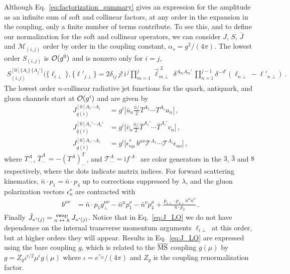 \documentclass[letterpaper,11pt]{article}
\def\cT{\mathcal{T}}
\newcommand{\eq}[1]{Eq.~\eqref{eq:#1}}
\newcommand{\gs}{g}
\newcommand{\img}{\mathrm{i}}
\newcommand{\cM}{\mathcal{M}}
\newcommand{\deltaslash}{{\delta\!\!\!{}^-}}
\newcommand{\nn}{\nonumber}
\newcommand{\MSbar}{\mbox{${\overline {\rm MS}}$}}
\newcommand{\bn}{{\bar n}}
\def\bnslash{\bar n\!\!\!\slash}
\begin{document}
Although \eq{factorization_summary} gives an expression for the amplitude as an infinite sum of soft and collinear factors, at any order in the expansion in the coupling, only a finite number of terms contribute. To see this, and to define our normalization for the soft and collinear operators, we can consider  $J$, $S$, $\bar J$ and $\cM_{(i,j)}$  order by order in the coupling constant, $\alpha_s=g^2/(4\pi)$. The lowest order $S_{(i,j)}$ is ${\cal O}(\gs^0)$ and is nonzero only for $i=j$,
\begin{align}\label{eq:S_LO}
  S_{(i,j)}^{[0]\{A_i\}\,\{A_j'\}}\bigl(\{\ell_{i\perp}\},\{\ell'_{j\perp}\}
  = 2\delta_{ij} \, j!\, \img^{\,j}  \prod_{m=1}^{j} \vec\ell_{m\perp}^{\;2}\, \delta^{A_m A_m'} \,  \prod_{n=1}^{j-1} \deltaslash^{d'}(\ell_{n\perp}-\ell'_{n\perp})\,. 
\end{align}
The lowest order $n$-collinear radiative jet functions for the quark, antiquark, and gluon channels start at ${\cal O}(g^i)$ and are
given by 
\begin{align}\label{eq:J_LO} 
J_{q(i)}^{[0]A_1\cdots A_i}
  &= \gs^i \Big[ \bar u_n  \frac{\bnslash}{2} T^{A_1}\cdots T^{A_i} u_n \Big] 
 \,, 
 \nn\\
 J_{\bar q(i)}^{[0]A_1'\cdots A_i'}
  &= \gs^i
    \Big[ \bar v_n  \frac{\bnslash}{2} \bar T^{A_1'}\cdots \bar T^{A_i'} v_n \Big] \,,
\nn\\
   J_{g(i)}^{[0]A_1\cdots A_i}
  &= \gs^i
    \Big[ \epsilon_{n\mu}^{*} \, b^{\mu\nu} \cT^{A_1}\cdots \cT^{A_i} \epsilon_{n\nu}\Big] 
  \,,
\end{align}
where $T^A_{\cdot\cdot}$, $\bar T^A_{\cdot\cdot}=-(T^A)^T_{\cdot\cdot}$, and $\cT^A_{\cdot\cdot} = \img f^{\cdot A \cdot}$ are color generators in the $3$, $\bar 3$ and $8$ respectively, where the dots indicate matrix indices.  For  forward scattering kinematics, $\bn\cdot p_1 = \bn\cdot p_4$ up to corrections suppressed by $\lambda$, and the gluon polarization vectors $\epsilon_n^\nu$ are contracted with
\begin{align} 
  b^{\mu\nu} &= \bn\cdot p_1 g_\perp^{\mu\nu} -\bn^\mu p_1^\nu - \bn^\nu p_4^\mu
    + \frac{p_{1\perp}\cdot p_{4\perp} \bn^\mu \bn^\nu}{\bn\cdot p_2 }
  \,.
\end{align}
Finally $\bar J_{\kappa'(j)} = \mbox{\raisebox{-0.1cm}{$\stackrel{\text{swap}}{\mbox{\scriptsize $n\leftrightarrow \bn$}}$}}\: J_{\kappa'(j)}$.
Notice that in \eq{J_LO} we do not have dependence on the internal transverse momentum arguments $\ell_{i\perp}$ at this order, but at higher orders they will appear.
Results in \eq{J_LO}  are expressed using the bare coupling $\gs$, which is related to the $\MSbar$ coupling $\gs(\mu)$ by 
$\gs = Z_g  \iota^{\epsilon/2} \mu^\epsilon  \gs(\mu) $  
where $\iota=e^{\gamma_E}/(4\pi)$ and $Z_g$ is the coupling renormalization factor. 
\end{document}
